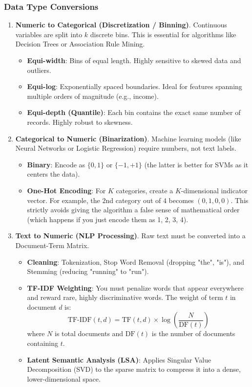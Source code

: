\documentclass[11pt]{article}
\theoremstyle{smallexample}
\begin{document}
\subsubsection{Data Type Conversions}

\begin{enumerate}
\item\textbf{Numeric to Categorical (Discretization / Binning)}.
Continuous variables are split into $k$ discrete bins. This is essential for algorithms like Decision Trees or Association Rule Mining.
\begin{itemize}
    \item \textbf{Equi-width}: Bins of equal length. Highly sensitive to skewed data and outliers.
    \item \textbf{Equi-log}: Exponentially spaced boundaries. Ideal for features spanning multiple orders of magnitude (e.g., income).
    \item \textbf{Equi-depth (Quantile)}: Each bin contains the exact same number of records. Highly robust to skewness.
\end{itemize}

\vspace{0.25cm}
\item\textbf{Categorical to Numeric (Binarization)}.
Machine learning models (like Neural Networks or Logistic Regression) require numbers, not text labels. 
\begin{itemize}
    \item \textbf{Binary}: Encode as $\{0, 1\}$ or $\{-1, +1\}$ (the latter is better for SVMs as it centers the data).
    \item \textbf{One-Hot Encoding}: For $K$ categories, create a $K$-dimensional indicator vector. For example, the 2nd category out of 4 becomes $(0, 1, 0, 0)$. This strictly avoids giving the algorithm a false sense of mathematical order (which happens if you just encode them as 1, 2, 3, 4).
\end{itemize}

\vspace{0.25cm}
\item \textbf{Text to Numeric (NLP Processing)}.
Raw text must be converted into a Document-Term Matrix.
\begin{itemize}
    \item \textbf{Cleaning}: Tokenization, Stop Word Removal (dropping "the", "is"), and Stemming (reducing "running" to "run").
    \item \textbf{TF-IDF Weighting}: You must penalize words that appear everywhere and reward rare, highly discriminative words. The weight of term $t$ in document $d$ is:
    \[
        \text{TF-IDF}(t, d) = \text{TF}(t,d) \times \log\!\left(\frac{N}{\text{DF}(t)}\right)
    \]
    where $N$ is total documents and $\text{DF}(t)$ is the number of documents containing $t$.
    \item \textbf{Latent Semantic Analysis (LSA)}: Applies Singular Value Decomposition (SVD) to the sparse matrix to compress it into a dense, lower-dimensional space.
\end{itemize}
\end{enumerate}
\end{document}
